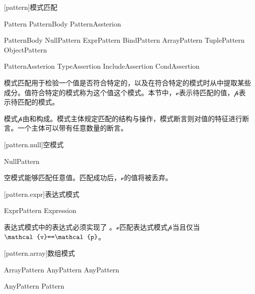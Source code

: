 
[pattern]{模式匹配}

\begin{bnf}{Pattern}
    PatternBody PatternAssterion\bnfs
\end{bnf}

\begin{bnf}{PatternBody}
    NullPattern \br
    ExprPattern \br
    BindPattern \br
    ArrayPattern \br
    TuplePattern \br
    ObjectPattern \br
\end{bnf}

\begin{bnf}{PatternAssterion}
    TypeAssertion
    IncludeAssertion
    CondAssertion
\end{bnf}

\pnum
模式匹配用于检验一个值是否符合特定的，以及在符合特定的模式时从中提取某些成分。值符合特定的模式称为这个值这个模式。本节中，$\mathcal{v}$表示待匹配的值，$\mathcal{p}$表示待匹配的模式。

\pnum
模式$\mathcal{p}$由和构成。模式主体规定匹配的结构与操作，模式断言则对值的特征进行断言。一个主体可以带有任意数量的断言。

[pattern.null]{空模式}

\begin{bnf}{NullPattern}
    \tcode{_}
\end{bnf}

\pnum
空模式能够匹配任意值。匹配成功后，$\mathcal{v}$的值将被丢弃。

[pattern.expr]{表达式模式}

\begin{bnf}{ExprPattern}
    Expression
\end{bnf}

\pnum
表达式模式中的表达式必须实现了 。$\mathcal{v}$匹配表达式模式$\mathcal{p}$当且仅当$\mathcal{v}\tcode{==}\mathcal{p}$。

[pattern.array]{数组模式}

\begin{bnf}{ArrayPattern}
    \terminal{[} AnyPattern \bnflp\terminal{,} AnyPattern\bnfrp\bnfs\ \terminal{]}
\end{bnf}

\begin{bnf}{AnyPattern}
    Pattern\br
\end{bnf}

